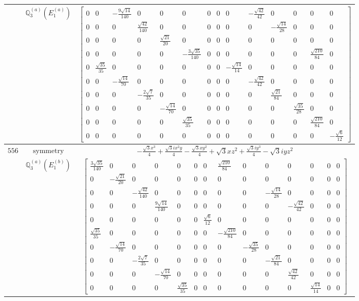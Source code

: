 \documentclass[fleqn,8pt,landscape]{jsarticle}
\begin{document}
\begin{longtable}{ccc}
$  $ & $ \mathbb{Q}_{3}^{(a)}(E_{1}^{(a)}) $ & $ \begin{bmatrix} 0 & 0 & - \frac{9 \sqrt{14}}{140} & 0 & 0 & 0 & 0 & 0 & 0 & - \frac{\sqrt{42}}{42} & 0 & 0 & 0 & 0 \\ 0 & 0 & 0 & \frac{\sqrt{42}}{140} & 0 & 0 & 0 & 0 & 0 & 0 & - \frac{\sqrt{14}}{28} & 0 & 0 & 0 \\ 0 & 0 & 0 & 0 & \frac{\sqrt{21}}{20} & 0 & 0 & 0 & 0 & 0 & 0 & 0 & 0 & 0 \\ 0 & 0 & 0 & 0 & 0 & - \frac{3 \sqrt{35}}{140} & 0 & 0 & 0 & 0 & 0 & 0 & \frac{\sqrt{210}}{84} & 0 \\ 0 & \frac{\sqrt{35}}{35} & 0 & 0 & 0 & 0 & 0 & 0 & - \frac{\sqrt{14}}{14} & 0 & 0 & 0 & 0 & 0 \\ 0 & 0 & - \frac{\sqrt{14}}{70} & 0 & 0 & 0 & 0 & 0 & 0 & - \frac{\sqrt{42}}{42} & 0 & 0 & 0 & 0 \\ 0 & 0 & 0 & - \frac{2 \sqrt{7}}{35} & 0 & 0 & 0 & 0 & 0 & 0 & \frac{\sqrt{21}}{84} & 0 & 0 & 0 \\ 0 & 0 & 0 & 0 & - \frac{\sqrt{14}}{70} & 0 & 0 & 0 & 0 & 0 & 0 & \frac{\sqrt{35}}{28} & 0 & 0 \\ 0 & 0 & 0 & 0 & 0 & \frac{\sqrt{35}}{35} & 0 & 0 & 0 & 0 & 0 & 0 & \frac{\sqrt{210}}{84} & 0 \\ 0 & 0 & 0 & 0 & 0 & 0 & 0 & 0 & 0 & 0 & 0 & 0 & 0 & - \frac{\sqrt{6}}{12} \end{bmatrix} $ \\ \hline
$ 556 $ & $ \text{symmetry} $ & $ - \frac{\sqrt{3} x^{3}}{4} + \frac{\sqrt{3} i x^{2} y}{4} - \frac{\sqrt{3} x y^{2}}{4} + \sqrt{3} x z^{2} + \frac{\sqrt{3} i y^{3}}{4} - \sqrt{3} i y z^{2} $ \\
$  $ & $ \mathbb{Q}_{3}^{(a)}(E_{1}^{(b)}) $ & $ \begin{bmatrix} \frac{3 \sqrt{35}}{140} & 0 & 0 & 0 & 0 & 0 & 0 & \frac{\sqrt{210}}{84} & 0 & 0 & 0 & 0 & 0 & 0 \\ 0 & - \frac{\sqrt{21}}{20} & 0 & 0 & 0 & 0 & 0 & 0 & 0 & 0 & 0 & 0 & 0 & 0 \\ 0 & 0 & - \frac{\sqrt{42}}{140} & 0 & 0 & 0 & 0 & 0 & 0 & - \frac{\sqrt{14}}{28} & 0 & 0 & 0 & 0 \\ 0 & 0 & 0 & \frac{9 \sqrt{14}}{140} & 0 & 0 & 0 & 0 & 0 & 0 & - \frac{\sqrt{42}}{42} & 0 & 0 & 0 \\ 0 & 0 & 0 & 0 & 0 & 0 & \frac{\sqrt{6}}{12} & 0 & 0 & 0 & 0 & 0 & 0 & 0 \\ \frac{\sqrt{35}}{35} & 0 & 0 & 0 & 0 & 0 & 0 & - \frac{\sqrt{210}}{84} & 0 & 0 & 0 & 0 & 0 & 0 \\ 0 & - \frac{\sqrt{14}}{70} & 0 & 0 & 0 & 0 & 0 & 0 & - \frac{\sqrt{35}}{28} & 0 & 0 & 0 & 0 & 0 \\ 0 & 0 & - \frac{2 \sqrt{7}}{35} & 0 & 0 & 0 & 0 & 0 & 0 & - \frac{\sqrt{21}}{84} & 0 & 0 & 0 & 0 \\ 0 & 0 & 0 & - \frac{\sqrt{14}}{70} & 0 & 0 & 0 & 0 & 0 & 0 & \frac{\sqrt{42}}{42} & 0 & 0 & 0 \\ 0 & 0 & 0 & 0 & \frac{\sqrt{35}}{35} & 0 & 0 & 0 & 0 & 0 & 0 & \frac{\sqrt{14}}{14} & 0 & 0 \end{bmatrix} $ \\ \hline

\end{longtable}
\end{document}

